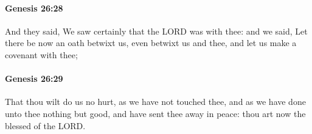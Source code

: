		\paragraph{Genesis 26:28} %
			\label{GENESIS-26-28}

			And they said, We saw certainly that the LORD was with thee: and we said, Let there be now an oath betwixt us, even betwixt us and thee, and let us make a covenant with thee;


		\paragraph{Genesis 26:29} %
			\label{GENESIS-26-29}

			That thou wilt do us no hurt, as we have not touched thee, and as we have done unto thee nothing but good, and have sent thee away in peace: thou art now the blessed of the LORD.



